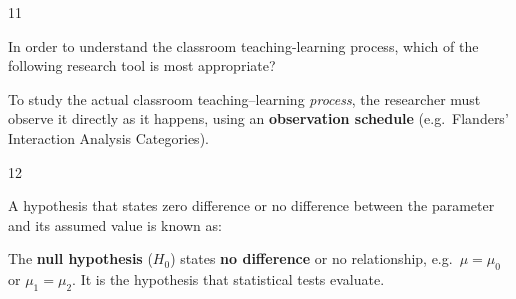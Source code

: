 \begin{question}{11}
{In order to understand the classroom teaching-learning process, which of the following research tool is most appropriate?\par}
\begin{explain}
To study the actual classroom teaching--learning \emph{process}, the researcher must observe it directly as it happens, using an \textbf{observation schedule} (e.g.\ Flanders' Interaction Analysis Categories).
\end{explain}
\end{question}

\begin{question}{12}
{A hypothesis that states zero difference or no difference between the parameter and its assumed value is known as:\par}
\begin{explain}
The \textbf{null hypothesis} ($H_0$) states \textbf{no difference} or no relationship, e.g.\ $\mu=\mu_0$ or $\mu_1=\mu_2$. It is the hypothesis that statistical tests evaluate.
\end{explain}
\end{question}

